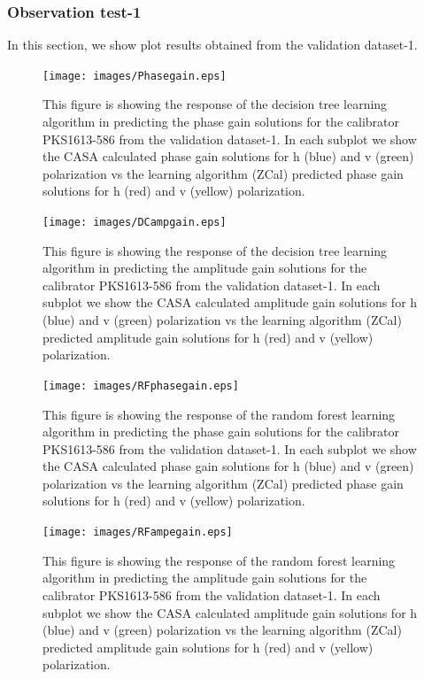 \subsubsection{Observation test-1}
In this section, we show plot results obtained from the validation dataset-1. 
 \begin{figure}[H]
    \texttt{[image: images/Phasegain.eps]}
    \caption{This figure is showing the response of the decision tree learning algorithm in predicting the phase gain solutions for the calibrator PKS1613-586 from the validation dataset-1. In each subplot we show the CASA calculated phase gain solutions for h (blue) and v (green) polarization vs the learning algorithm (ZCal) predicted phase gain solutions for h (red) and v (yellow) polarization.}
    \label{obs1}
\end{figure}

\begin{figure}[H]
    \texttt{[image: images/DCampgain.eps]}
    \caption{This figure is showing the response of the decision tree learning algorithm in predicting the amplitude gain solutions for the calibrator PKS1613-586 from the validation dataset-1. In each subplot we show the CASA calculated amplitude gain solutions for h (blue) and v (green) polarization vs the learning algorithm (ZCal) predicted amplitude gain solutions for h (red) and v (yellow) polarization.}
     \label{da1}
\end{figure}


\begin{figure}[H]
    \texttt{[image: images/RFphasegain.eps]}
    \caption{This figure is showing the response of the random forest learning algorithm in predicting the phase gain solutions for the calibrator PKS1613-586 from the validation dataset-1. In each subplot we show the CASA calculated phase gain solutions for h (blue) and v (green) polarization vs the learning algorithm (ZCal) predicted phase gain solutions for h (red) and v (yellow) polarization.}
    \label{obs2}
\end{figure}

\begin{figure}[H]
    \texttt{[image: images/RFampegain.eps]}
    \caption{This figure is showing the response of the random forest learning algorithm in predicting the amplitude gain solutions for the calibrator PKS1613-586 from the validation dataset-1. In each subplot we show the CASA calculated amplitude gain solutions for h (blue) and v (green) polarization vs the learning algorithm (ZCal) predicted amplitude gain solutions for h (red) and v (yellow) polarization.}
     \label{ra1}
\end{figure}


